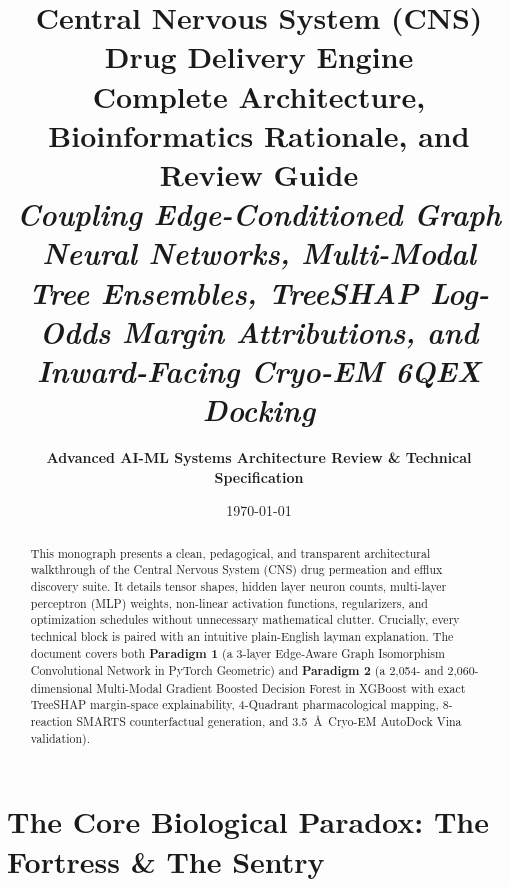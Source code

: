 \documentclass[11pt,a4paper]{article}
\title{\textbf{\huge Central Nervous System (CNS) Drug Delivery Engine}\\[0.4em]
\Large Complete Architecture, Bioinformatics Rationale, and Review Guide\\[0.3em]
\large \textit{Coupling Edge-Conditioned Graph Neural Networks, Multi-Modal Tree Ensembles, TreeSHAP Log-Odds Margin Attributions, and Inward-Facing Cryo-EM 6QEX Docking}}
\author{\textbf{Advanced AI-ML Systems Architecture Review \& Technical Specification}}
\date{\today}
\begin{document}
\maketitle

\begin{abstract}
This monograph presents a clean, pedagogical, and transparent architectural walkthrough of the Central Nervous System (CNS) drug permeation and efflux discovery suite. It details tensor shapes, hidden layer neuron counts, multi-layer perceptron (MLP) weights, non-linear activation functions, regularizers, and optimization schedules without unnecessary mathematical clutter. Crucially, every technical block is paired with an intuitive plain-English layman explanation. The document covers both \textbf{Paradigm 1} (a 3-layer Edge-Aware Graph Isomorphism Convolutional Network in PyTorch Geometric) and \textbf{Paradigm 2} (a 2,054- and 2,060-dimensional Multi-Modal Gradient Boosted Decision Forest in XGBoost with exact TreeSHAP margin-space explainability, 4-Quadrant pharmacological mapping, 8-reaction SMARTS counterfactual generation, and 3.5~\AA\ Cryo-EM AutoDock Vina validation).
\end{abstract}

\tableofcontents
\newpage

\section{The Core Biological Paradox: The Fortress \& The Sentry}
\end{document}

